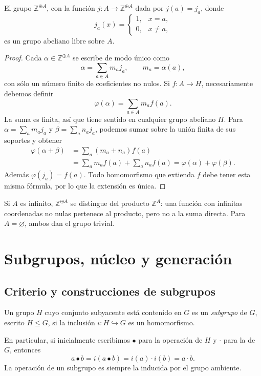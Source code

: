 \begin{prop}\label{prop:C4-libre-abeliano}
El grupo $\mathbb Z^{\oplus A}$, con la función $j:A\to\mathbb Z^{\oplus A}$ dada por $j(a)=j_a$, donde
\[
j_a(x)=\begin{cases}1,&x=a,\\0,&x\ne a,\end{cases}
\]
es un grupo abeliano libre sobre $A$.
\end{prop}
\begin{proof}
Cada $\alpha\in\mathbb Z^{\oplus A}$ se escribe de modo único como
\[
\alpha=\sum_{a\in A}m_a j_a,\qquad m_a=\alpha(a),
\]
con sólo un número finito de coeficientes no nulos. Si $f:A\to H$, necesariamente debemos definir
\[
\varphi(\alpha)=\sum_{a\in A}m_a f(a).
\]
La suma es finita, así que tiene sentido en cualquier grupo abeliano $H$. Para $\alpha=\sum_a m_a j_a$ y $\beta=\sum_a n_a j_a$, podemos sumar sobre la unión finita de sus soportes y obtener
\begin{align*}
\varphi(\alpha+\beta)
&=\sum_a(m_a+n_a)f(a)\\
&=\sum_a m_a f(a)+\sum_a n_a f(a)
=\varphi(\alpha)+\varphi(\beta).
\end{align*}
Además $\varphi(j_a)=f(a)$. Todo homomorfismo que extienda $f$ debe tener esta misma fórmula, por lo que la extensión es única.
\end{proof}
Si $A$ es infinito, $\mathbb Z^{\oplus A}$ se distingue del producto $\mathbb Z^A$: una función con infinitas coordenadas no nulas pertenece al producto, pero no a la suma directa. Para $A=\varnothing$, ambos dan el grupo trivial.

\section{Subgrupos, núcleo y generación}
\subsection{Criterio y construcciones de subgrupos}
\begin{defi}
Un grupo $H$ cuyo conjunto subyacente está contenido en $G$ es un \emph{subgrupo} de $G$, escrito $H\le G$, si la inclusión $i:H\hookrightarrow G$ es un homomorfismo.
\end{defi}
En particular, si inicialmente escribimos $\bullet$ para la operación de $H$ y $\cdot$ para la de $G$, entonces
\[
a\bullet b=i(a\bullet b)=i(a)\cdot i(b)=a\cdot b.
\]
La operación de un subgrupo es siempre la inducida por el grupo ambiente.

